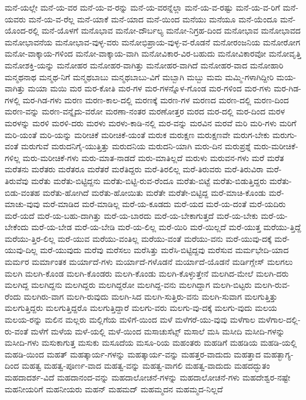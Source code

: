 {ಮನೆ-ಯಲ್ಲೇ
ಮನೆ-ಯ-ವರ
ಮನೆ-ಯ-ವ-ರನ್ನು
ಮನೆ-ಯ-ವರನ್ನೆಲ್ಲಾ
ಮನೆ-ಯ-ವ-ರಷ್ಟು
ಮನೆ-ಯ-ವ-ರಿಗೆ
ಮನೆ-ಯವರು
ಮನೆ-ಯ-ವ-ರೆಲ್ಲ
ಮನೆ-ಯಾಕೆ
ಮನೆ-ಯಾದ
ಮನೆ-ಯಿಂದ
ಮನೆಯು
ಮನೆಯೂ
ಮನೆ-ಯೆಂದೂ
ಮನೆ-ಯೊಂದ-ರಲ್ಲಿ
ಮನೆ-ಯೊಳಗೆ
ಮನೊಭಾವ
ಮನೋ-ದೌರ್ಬಲ್ಯ
ಮನೋ-ನಿಗ್ರಹ-ದಿಂದ
ಮನೋಭಾವ
ಮನೋಭಾವದ
ಮನೋಭಾವನೆಯ
ಮನೋಭಾವ-ವುಳ್ಳ-ವರು
ಮನೋಭಿಪ್ರಾಯ-ವುಳ್ಳ-ವ-ರೊಡನೆ
ಮನೋರಂಜನಿಯ
ಮನೋರೋಗ
ಮನೋ-ವಾಕ್ಕಾಯ-ಗಳಿಂದ
ಮನೋ-ವಾಕ್ಕಾಯ-ವಾಗಿ
ಮನೋವಿಕಾರ-ವಿರ-ಬಹುದು
ಮನೋವಿಕಾರವೋ
ಮನೋವೃತ್ತಿ
ಮನೋಶಕ್ತಿ-ಯನ್ನು
ಮನೋಹರ
ಮನೋಹರ-ವಾಗಿತ್ತು
ಮನೋಹರ-ವಾಗಿದೆ
ಮನೋಹರ-ವಾದ
ಮನೋಹಾರಿ
ಮನ್ಮಥನಾಥ
ಮನ್ಮಥ-ನಿಗೆ
ಮನ್ಮಥಬಾಬು
ಮನ್ಮಥಬಾಬು-ವಿಗೆ
ಮಬ್ಬಾಗಿ
ಮಬ್ಬು
ಮಮ
ಮಮ್ಮಿ-ಗಳಾಗಿದ್ದೀರಿ
ಮಯ-ವಾಗಿತ್ತು
ಮಯಾ
ಮಯಿ
ಮರ
ಮರ-ಕೋತಿ
ಮರ-ಗಳ
ಮರ-ಗಳನ್ನೊಳ-ಗೊಂಡ
ಮರ-ಗಳಿಂದ
ಮರ-ಗಳು
ಮರ-ಗಿಡ-ಗಳಲ್ಲಿ
ಮರ-ಗಿಡ-ಗಳು
ಮರಣ
ಮರಣ-ಕಾಲ-ದಲ್ಲಿ
ಮರಣಕ್ಕೆ
ಮರಣ-ಗಳ
ಮರಣದ
ಮರಣ-ದಲ್ಲಿ
ಮರಣ-ದಿಂದ
ಮರಣ-ವನ್ನು
ಮರಣ-ವನ್ನೈದು-ವರೋ
ಮರಣಾ-ನಂತರ
ಮರಣೋತ್ತರ
ಮರದ
ಮರ-ದಲ್ಲಿ
ಮರ-ದಿಂದ
ಮರಳ
ಮರಳನ್ನು
ಮರಳಿ
ಮರಳಿ-ದರು
ಮರಳು
ಮರಳು-ಕಾಡಿ-ನಲ್ಲಿ
ಮರ-ವನ್ನು
ಮರವಿನ
ಮರವೆ
ಮರಿ
ಮರಿ-ಗಳು
ಮರಿಗೆ
ಮರಿ-ಯಂತೆ
ಮರಿ-ಯನ್ನು
ಮರೀಚಿಕೆ
ಮರೀಚಿಕೆ-ಯಂತೆ
ಮರುಕ
ಮರುಕ್ಷಣ
ಮರುಕ್ಷಣವೇ
ಮರುಗ-ಬೇಕು
ಮರುಗು-ವಂತೆ
ಮರುಗುವೆ
ಮರುದನಿಗೈ-ಯುತ್ತಿತ್ತು
ಮರುದನಿಯ
ಮರುದನಿ-ಯಾಗಿ
ಮರು-ದಿನ
ಮರುಪ್ರಶ್ನೆ
ಮರು-ಮರೀಚಿಕೆ-ಗಳಿಲ್ಲ
ಮರು-ಮರೀಚಿಕೆ-ಗಳು
ಮರು-ಮಾತ-ನಾಡದೆ
ಮರು-ಮಾತಿಲ್ಲದೆ
ಮರುಳು
ಮರುವನ-ಗಳು
ಮರೆ
ಮರೆತ
ಮರೆತನು
ಮರೆತರು
ಮರೆತರೂ
ಮರೆತರೆ
ಮರೆತಿದ್ದರು
ಮರೆ-ತಿರಲಿಲ್ಲ
ಮರೆ-ತಿರುವರು
ಮರೆ-ತಿರುವಿರಾ
ಮರೆ-ತಿರುವೆವು
ಮರೆತು
ಮರೆತು-ಬಿಟ್ಟಿದ್ದನು
ಮರೆತು-ಬಿಟ್ಟಿ-ರುವ-ರೆಂದೂ
ಮರೆತು-ಬಿಟ್ಟೆ
ಮರೆತು-ಬಿಡುತ್ತಿದ್ದರು
ಮರೆತು-ಬಿಡು-ವಂತಹ
ಮರೆತು-ಹೋಗಿದೆ
ಮರೆತು-ಹೋಯಿತು
ಮರೆತೇ
ಮರೆತೇ-ಬಿಟ್ಟಿದ್ದ
ಮರೆ-ಮಾಚಿ-ಕೊಂಡು
ಮರೆ-ಮಾಚು-ವುವು
ಮರೆ-ಮಾಡಿದ
ಮರೆ-ಮಾಡಿಲ್ಲ
ಮರೆ-ಯ-ಕೂಡದು
ಮರೆ-ಯದ
ಮರೆ-ಯ-ದಂತೆ
ಮರೆ-ಯದಿರು
ಮರೆ-ಯದೆ
ಮರೆ-ಯ-ಬಹು-ದಾಗಿತ್ತು
ಮರೆ-ಯ-ಬಾರದು
ಮರೆ-ಯ-ಬೇಕಾಗುತ್ತದೆ
ಮರೆ-ಯ-ಬೇಕು
ಮರೆ-ಯ-ಬೇಕೆಂದು
ಮರೆ-ಯ-ಬೇಡ
ಮರೆ-ಯ-ಬೇಡಿ
ಮರೆ-ಯ-ಲಿಲ್ಲ
ಮರೆ-ಯಿರಿ
ಮರೆ-ಯಿಲ್ಲದೆ
ಮರೆ-ಯುತ್ತ
ಮರೆಯು-ತ್ತಿದ್ದೆ
ಮರೆಯು-ತ್ತಿರ-ಲಿಲ್ಲ
ಮರೆ-ಯುವ
ಮರೆಯು-ವಂತಿಲ್ಲ
ಮರೆಯು-ವಂತೆ
ಮರೆಯು-ವನು
ಮರೆ-ಯುವು-ದಕ್ಕೆ
ಮರೆ-ಯುವು-ದಿಲ್ಲ
ಮರೆ-ಯುವುದು
ಮರೆವು
ಮರೆಸಲು
ಮರೆಸಿತ್ತು
ಮರೆಸಿ-ಬಿಟ್ಟಿದ್ದವು
ಮರೆಸುವ
ಮರ್ಮಭೇದಿ-ಯಾದ
ಮರ್ಮರ
ಮರ್ಮಾಂತಕ
ಮರ್ಯಾದೆ-ಗಳು
ಮರ್ಯಾದೆ-ಗಳೊಡನೆ
ಮರ್ಯಾದೆ-ಯೊಡನೆ
ಮರ್ಡಿಗ್ಲೇಸ್
ಮಲಗಲು
ಮಲಗಿ
ಮಲಗಿ-ಕೊಂಡ
ಮಲಗಿ-ಕೊಂಡರು
ಮಲಗಿ-ಕೊಂಡು
ಮಲಗಿ-ಕೊಳ್ಳುತ್ತೇನೆ
ಮಲಗಿದ-ಮೇಲೆ
ಮಲಗಿ-ದರು
ಮಲಗಿದ್ದ
ಮಲಗಿದ್ದನು
ಮಲಗಿದ್ದರು
ಮಲಗಿದ್ದರೋ
ಮಲಗಿದ್ದ-ವನು
ಮಲಗಿದ್ದಾಗ
ಮಲಗಿ-ಬಿಟ್ಟರು
ಮಲಗಿ-ರುವ-ರೆಂದು
ಮಲಗಿರು-ವಾಗ
ಮಲಗಿ-ರುವುದು
ಮಲಗಿ-ಸಿದ
ಮಲಗಿ-ಸುತ್ತಿರು-ವನು
ಮಲಗಿ-ಸುವಾಗ
ಮಲಗುತ್ತಿತ್ತು
ಮಲಗುತ್ತಿದ್ದರು
ಮಲಗುತ್ತಿದ್ದರೊ
ಮಲಗುತ್ತಿದ್ದಾರೆ
ಮಲಗು-ವರು
ಮಲಗು-ವು-ದಕ್ಕೆ
ಮಲಗು-ವುದು
ಮಲಯ
ಮಲಯ-ರನ್ನು
ಮಲಿನ
ಮಲ್ಲರು
ಮಲ್ಲಿಗೆಯ
ಮಳಿಗೆ-ಯಿಂದ
ಮಳೆ
ಮಳೆಗರೆ-ಯು-ವುವು
ಮಳೆಗಾಲ
ಮಳೆಗಾಲ-ದಲ್ಲಿ-ರು-ವಂತೆ
ಮಳೆಗೆ
ಮಳೆಯ
ಮಳೆ-ಯಲ್ಲಿ
ಮಳೆ-ಯಿಂದ
ಮಸಾಚುಸೆಟ್ಸ್
ಮಸಾಲೆ
ಮಸಿ
ಮಸೀದಿ
ಮಸೀದಿ-ಗಳನ್ನು
ಮಸೀದಿ-ಗಳು
ಮಸುಕಾಗುತ್ತ
ಮಸುಕು
ಮಸೂದೆಯ
ಮಸೂ-ರಿಯ
ಮಹಂತರು
ಮಹಡಿಗೆ
ಮಹಡಿಯ
ಮಹಡಿ-ಯಲ್ಲಿ
ಮಹಡಿ-ಯಿಂದ
ಮಹತ್
ಮಹತ್ಕಾರ್ಯ-ಗಳನ್ನು
ಮಹತ್ಕಾರ್ಯ-ವನ್ನು
ಮಹತ್ತರ-ವಾದುದು
ಮಹತ್ತಾದ
ಮಹತ್ಭಾಗ್ಯ-ದಿಂದ
ಮಹತ್ವ
ಮಹತ್ವ-ಪೂರ್ಣ-ವಾದ
ಮಹತ್ವ-ವನ್ನು
ಮಹತ್ವ-ವಾಗಲಿ
ಮಹತ್ವ-ವಾದುದು
ಮಹದದ್ಭುತಂ
ಮಹದಾದರ್ಶ-ವಿದೆ
ಮಹದಾನಂದ-ವನ್ನು
ಮಹದಾಲೋಚನೆ-ಗಳನ್ನು
ಮಹದಾಲೋಚನೆ-ಗಳು
ಮಹದೇಶ್ವರ-ನಷ್ಟೇ
ಮಹನೀಯರಿಗೆ
ಮಹನೀಯರು
ಮಹನ್
ಮಹಮದ್
ಮಹಮ್ಮದನ
ಮಹಮ್ಮದ-ನಿಲ್ಲದೆ
}
